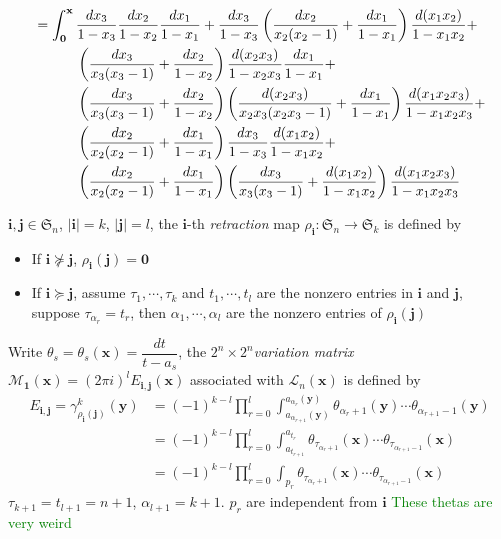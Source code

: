\documentclass[main]{subfiles}
\begin{document}
\begin{example}
\begin{align*}
&=\int_{\mathbf0}^{\mathbf x}\frac{dx_3}{1-x_3}\frac{dx_2}{1-x_2}\frac{dx_1}{1-x_1}+\frac{dx_3}{1-x_3}\left(\frac{dx_2}{x_2(x_2-1)}+\frac{dx_1}{1-x_1}\right)\frac{d(x_1x_2)}{1-x_1x_2}+ \\
&\mkern55mu \left(\frac{dx_3}{x_3(x_3-1)}+\frac{dx_2}{1-x_2}\right)\frac{d(x_2x_3)}{1-x_2x_3}\frac{dx_1}{1-x_1}+ \\
&\mkern55mu \left(\frac{dx_3}{x_3(x_3-1)}+\frac{dx_2}{1-x_2}\right)\left(\frac{d(x_2x_3)}{x_2x_3(x_2x_3-1)}+\frac{dx_1}{1-x_1}\right)\frac{d(x_1x_2x_3)}{1-x_1x_2x_3}+ \\
&\mkern55mu \left(\frac{dx_2}{x_2(x_2-1)}+\frac{dx_1}{1-x_1}\right)\frac{dx_3}{1-x_3}\frac{d(x_1x_2)}{1-x_1x_2}+ \\
&\mkern55mu \left(\frac{dx_2}{x_2(x_2-1)}+\frac{dx_1}{1-x_1}\right)\left(\frac{dx_3}{x_3(x_3-1)}+\frac{d(x_1x_2)}{1-x_1x_2}\right)\frac{d(x_1x_2x_3)}{1-x_1x_2x_3} \\
\end{align*}
\end{example}

\begin{definition}
$\mathbf i,\mathbf j\in\mathfrak S_n$, $|\mathbf i|=k$, $|\mathbf j|=l$, the $\mathbf i$-th \textit{retraction} map $\rho_{\mathbf i}:\mathfrak S_n\to\mathfrak S_k$ is defined by
\begin{itemize}
\item If $\mathbf i\not\succeq\mathbf j$, $\rho_{\mathbf i}(\mathbf j)=\mathbf 0$
\item If $\mathbf i\succeq\mathbf j$, assume $\tau_1,\cdots,\tau_k$ and $t_1,\cdots,t_l$ are the nonzero entries in $\mathbf i$ and $\mathbf j$, suppose $\tau_{\alpha_r}=t_r$, then $\alpha_1,\cdots,\alpha_l$ are the nonzero entries of $\rho_{\mathbf i}(\mathbf j)$
\end{itemize}
Write $\theta_s=\theta_s(\mathbf x)=\dfrac{dt}{t-a_s}$, the $2^n\times2^n$\textit{variation matrix} $\mathcal M_{\mathbf 1}(\mathbf x)=(2\pi i)^lE_{\mathbf i,\mathbf j}(\mathbf x)$ associated with $\mathcal L_n(\mathbf x)$ is defined by
\begin{align*}
E_{\mathbf i,\mathbf j}=\gamma^k_{\rho_{\mathbf i}(\mathbf j)}(\mathbf y)&=(-1)^{k-l}\prod_{r=0}^l\int_{a_{\alpha_{r+1}}(\mathbf y)}^{a_{\alpha_r}(\mathbf y)}\theta_{\alpha_r+1}(\mathbf y)\cdots\theta_{\alpha_{r+1}-1}(\mathbf y) \\
&=(-1)^{k-l}\prod_{r=0}^l\int_{a_{t_{r+1}}}^{a_{t_r}}\theta_{\tau_{\alpha_r+1}}(\mathbf x)\cdots\theta_{\tau_{\alpha_{r+1}-1}}(\mathbf x) \\
&=(-1)^{k-l}\prod_{r=0}^l\int_{p_r}\theta_{\tau_{\alpha_r+1}}(\mathbf x)\cdots\theta_{\tau_{\alpha_{r+1}-1}}(\mathbf x)
\end{align*}
$\tau_{k+1}=t_{l+1}=n+1$, $\alpha_{l+1}=k+1$. $p_r$ are independent from $\mathbf i$
\textcolor{green}{These thetas are very weird}
\end{definition}
\end{document}
